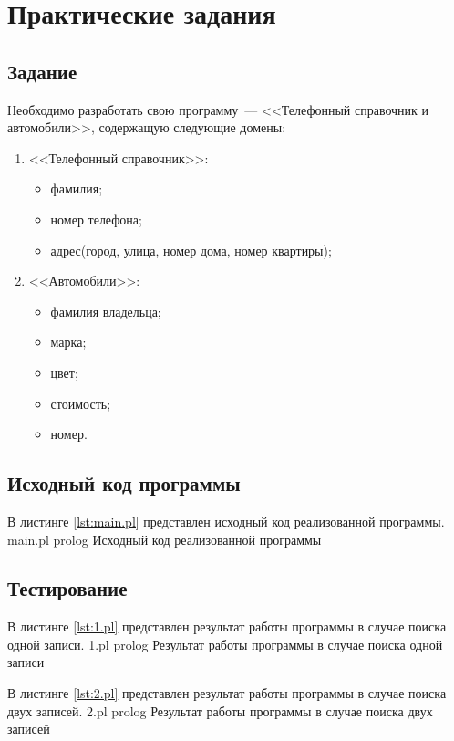 \chapter{Практические задания}

\section{Задание}

Необходимо разработать свою программу~--- <<Телефонный справочник и автомобили>>, содержащую следующие домены: 
\begin{enumerate}
	\item <<Телефонный справочник>>:
	\begin{itemize}
		\item фамилия;
		\item номер телефона;
		\item адрес(город, улица, номер дома, номер квартиры);
	\end{itemize}
	\item <<Автомобили>>:
	\begin{itemize}
		\item фамилия владельца;
		\item марка;
		\item цвет;
		\item стоимость;
		\item номер.
	\end{itemize}
\end{enumerate}

\section{Исходный код программы}

В листинге \ref{lst:main.pl} представлен исходный код реализованной программы.
	{main.pl}
	{prolog}
	{Исходный код реализованной программы}

\section{Тестирование}

В листинге \ref{lst:1.pl} представлен результат работы программы в случае поиска одной записи.
	{1.pl}
	{prolog}
	{Результат работы программы в случае поиска одной записи}

В листинге \ref{lst:2.pl} представлен результат работы программы в случае поиска двух записей.
	{2.pl}
	{prolog}
	{Результат работы программы в случае поиска двух записей}
	
